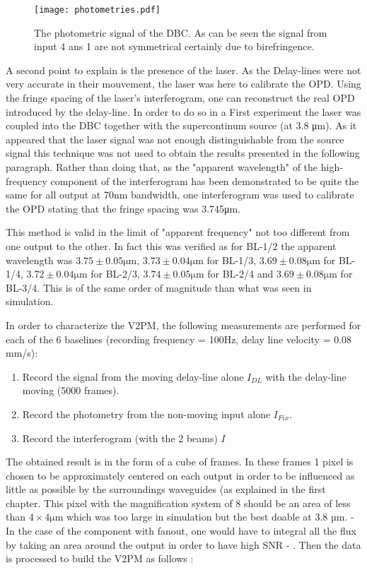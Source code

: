 \begin{figure}
 \centering
 \texttt{[image: photometries.pdf]}
 \caption{The photometric signal of the DBC. As can be seen the signal from input 4 ans 1 are not symmetrical certainly due to birefringence.}
 \label{fig:photometries}
\end{figure}

A second point to explain is the presence of the laser. As the Delay-lines were not very accurate in their mouvement, the laser was here to calibrate the OPD. Using the fringe spacing of the laser's interferogram, one can reconstruct the real OPD introduced by the delay-line. In order to do so in a First experiment the laser was coupled into the DBC together with the supercontinum source (at 3.8 \si{\micro\meter}). As it appeared that the laser signal was not enough distinguishable from the source signal this technique was not used to obtain the results presented in the following paragraph.  Rather than doing that, as the "apparent wavelength" of the high-frequency component of the interferogram has been demonstrated to be quite the same for all output at 70nm bandwidth, one interferogram was used to calibrate the OPD stating that the fringe spacing was 3.745\si{\micro\meter}. 

This method is valid in the limit of "apparent frequency" not too different from one output to the other. In fact this was verified as for BL-1/2 the apparent wavelength was $3.75\pm0.05\si{\micro\meter}$, $3.73\pm0.04\si{\micro\meter}$ for BL-1/3, $3.69\pm0.08\si{\micro\meter}$ for BL-1/4, $3.72\pm0.04\si{\micro\meter}$ for BL-2/3, $3.74\pm0.05\si{\micro\meter}$ for BL-2/4 and $3.69\pm0.08\si{\micro\meter}$ for BL-3/4. This is of the same order of magnitude than what was seen in simulation. 

In order to characterize the V2PM, the following measurements are performed for each of the 6 baselines (recording frequency = 100Hz, delay line velocity = 0.08 mm/s):
\begin{enumerate}
 \item Record the signal from the moving delay-line alone $I_{DL}$ with the delay-line moving (5000 frames).
 \item Record the photometry from the non-moving input alone $I_{Fix}$.
 \item Record the interferogram (with the 2 beams) $I$
\end{enumerate}

The obtained result is in the form of a cube of frames. In these frames 1 pixel is chosen to be approximately centered on each output in order to be influenced as little as possible by the surroundings waveguides (as explained in the first chapter. This pixel with the magnification system of 8 should be an area of less than $4\times 4 \si{\micro\meter}$ which was too large in simulation but the best doable at 3.8 µm. - In the case of the component with fanout, one would have to integral all the flux by taking an area around the output in order to have high SNR - . Then the data is processed to build the V2PM as follows :


